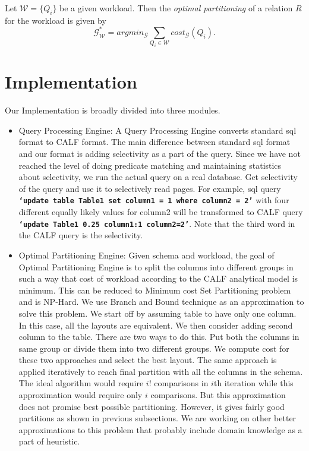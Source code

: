 \documentclass[twocolumn,11pt]{article}
\newcommand{\g}{\mathcal{G}}
\newcommand{\sql}[1]{{\tt \textbf{#1}}}
\newcommand{\wk}{\mathcal{W}}
\begin{document}
\begin{itemize}
	Let $\wk = \{Q_i\}$ be a given workload. Then the {\em optimal partitioning} of
	a relation $R$ for the workload  is given by
	\[ \g_\wk^* = argmin_{\g} \sum_{Q_i \in \wk} cost_{\g}(Q_i). \]
\end{itemize}

\section{Implementation}

Our Implementation is broadly divided into three modules. 

\begin{itemize}
	\item Query Processing Engine:
	A Query Processing Engine converts standard sql format to CALF format. The main 
	difference between standard sql format and our format is adding selectivity as a 
	part of the query. Since we have not reached the level of doing predicate matching 
	and maintaining statistics about selectivity, we run the actual query on a 
	real database. Get selectivity of the query and use it to selectively read 
	pages. For example, sql query \sql{`update table $Table1$ set $column1 = 1$ where $column2 = 2$'}
	with four different equally likely values for column2 will be transformed to 
	CALF query \sql{`update $Table1$ 0.25 $column1:1$ $column2=2$'}. Note that the third 
	word in the CALF query is the selectivity.

	\item Optimal Partitioning Engine: 
	Given schema and workload, the goal of Optimal Partitioning Engine is to split the 
	columns into different groups in such a way that cost of workload according to the 
	CALF analytical model is minimum. This can be reduced to Minimum cost Set Partitioning
	problem and is NP-Hard. We use Branch and Bound technique as an approximation to 
	solve this problem. We start off by assuming table to have only one column. In this 
	case, all the layouts are equivalent. We then consider adding second column to the 
	table. There are two ways to do this. Put both the columns in same group or divide 
	them into two different groups. We compute cost for these two approaches and select 
	the best layout. The same approach is applied iteratively to reach final partition 
	with all the columns in the schema. The ideal algorithm would require $i!$ 
	comparisons in $i$th iteration while this approximation would require only $i$ 
	comparisons. But this approximation does not promise best possible partitioning. 
	However, it gives fairly good partitions as shown in previous subsections. We are 
	working on other better approximations to this problem that probably include domain 
	knowledge as a part of heuristic.


\end{itemize}
\end{document}
